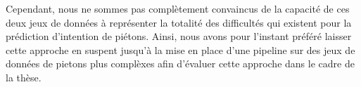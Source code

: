 Cependant, nous ne sommes pas complètement convaincus de la capacité de ces deux jeux de données à représenter la totalité des difficultés qui existent pour la prédiction d'intention de piétons. Ainsi, nous avons pour l'instant préféré laisser cette approche en suspent jusqu'à la mise en place d'une pipeline sur des jeux de données de pietons plus complèxes afin d'évaluer cette approche dans le cadre de la thèse.
